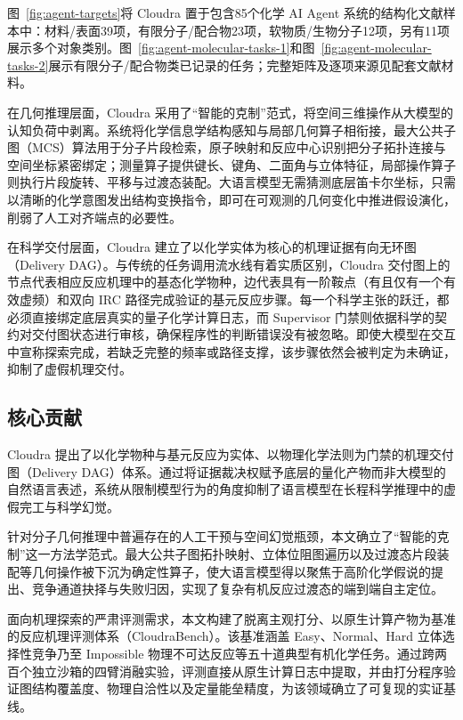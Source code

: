图~\ref{fig:agent-targets}将 Cloudra 置于包含85个化学 AI Agent 系统的结构化文献样本中：材料/表面39项，有限分子/配合物23项，软物质/生物分子12项，另有11项展示多个对象类别。图~\ref{fig:agent-molecular-tasks-1}和图~\ref{fig:agent-molecular-tasks-2}展示有限分子/配合物类已记录的任务；完整矩阵及逐项来源见配套文献材料。



在几何推理层面，Cloudra 采用了“智能的克制”范式，将空间三维操作从大模型的认知负荷中剥离。系统将化学信息学结构感知与局部几何算子相衔接，最大公共子图（MCS）算法用于分子片段检索，原子映射和反应中心识别把分子拓扑连接与空间坐标紧密绑定；测量算子提供键长、键角、二面角与立体特征，局部操作算子则执行片段旋转、平移与过渡态装配。大语言模型无需猜测底层笛卡尔坐标，只需以清晰的化学意图发出结构变换指令，即可在可观测的几何变化中推进假设演化，削弱了人工对齐端点的必要性。



在科学交付层面，Cloudra 建立了以化学实体为核心的机理证据有向无环图（Delivery DAG）。与传统的任务调用流水线有着实质区别，Cloudra 交付图上的节点代表相应反应机理中的基态化学物种，边代表具有一阶鞍点（有且仅有一个有效虚频）和双向 IRC 路径完成验证的基元反应步骤。每一个科学主张的跃迁，都必须直接绑定底层真实的量子化学计算日志，而 Supervisor 门禁则依据科学的契约对交付图状态进行审核，确保程序性的判断错误没有被忽略。即使大模型在交互中宣称探索完成，若缺乏完整的频率或路径支撑，该步骤依然会被判定为未确证，抑制了虚假机理交付。



\subsection{核心贡献}

Cloudra 提出了以化学物种与基元反应为实体、以物理化学法则为门禁的机理交付图（Delivery DAG）体系。通过将证据裁决权赋予底层的量化产物而非大模型的自然语言表述，系统从限制模型行为的角度抑制了语言模型在长程科学推理中的虚假完工与科学幻觉。

针对分子几何推理中普遍存在的人工干预与空间幻觉瓶颈，本文确立了“智能的克制”这一方法学范式。最大公共子图拓扑映射、立体位阻图遍历以及过渡态片段装配等几何操作被下沉为确定性算子，使大语言模型得以聚焦于高阶化学假说的提出、竞争通道抉择与失败归因，实现了复杂有机反应过渡态的端到端自主定位。

面向机理探索的严肃评测需求，本文构建了脱离主观打分、以原生计算产物为基准的反应机理评测体系（CloudraBench）。该基准涵盖 Easy、Normal、Hard 立体选择性竞争乃至 Impossible 物理不可达反应等五十道典型有机化学任务。通过跨两百个独立沙箱的四臂消融实验，评测直接从原生计算日志中提取，并由打分程序验证图结构覆盖度、物理自洽性以及定量能垒精度，为该领域确立了可复现的实证基线。

